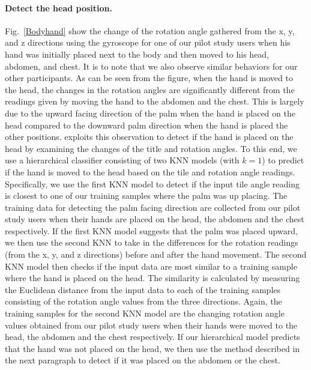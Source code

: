 
\paragraph{Detect the head position.}
Fig.~\ref{Bodyhand} show the change of the rotation angle gathered from the x, y, and z directions using the gyroscope for one of our pilot
study users when his hand was initially placed next to the body and then moved to his head, abdomen, and chest. It is to note that we also
observe similar behaviors for our other participants. As can be seen from the figure, when the hand is moved to the head, the changes in
the rotation angles are significantly different from the readings given by moving the hand to the abdomen and the chest. This is largely
due to the upward facing direction of the palm when the hand is placed on the head compared to the downward palm direction when the hand is
placed the other positions. \systemname exploits this observation to detect if the hand is placed on the head by examining the changes of
the title and rotation angles. To this end, we use a hierarchical classifier consisting of two KNN models (with $k=1$) to predict if the
hand is moved to the head based on the tile and rotation angle readings. Specifically, we use the first KNN model to detect if the input
tile angle reading is closest to one of our training samples where the palm was up placing. The training data for detecting the palm facing
direction are collected from our pilot study users when their hands are placed on the head, the abdomen and the chest respectively. If the
first KNN model suggests that the palm was placed upward, we then use the second KNN to take in the differences for the rotation readings
(from the x, y, and z directions) before and after the hand movement. The second KNN model then checks if the input data are most similar
to a training sample where the hand is placed on the head. The similarity is calculated by measuring the Euclidean distance from the input
data to each of the training samples consisting of the rotation angle values from the three directions. Again, the training samples for the
second KNN model are the changing rotation angle values obtained from our pilot study users when their hands were moved to the head, the
abdomen and the chest respectively. If our hierarchical model predicts that the hand was not placed on the head, we then use the method
described in the next paragraph to detect if it was placed on the abdomen or the chest.

